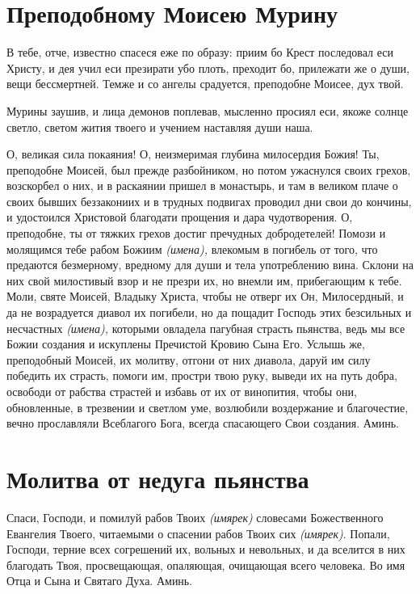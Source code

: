 \section{Преподобному Моисею Мурину}\begin{mymulticols}


В тебе, отче, известно спасеся еже по образу: приим бо Крест последовал еси Христу, и дея учил еси презирати убо плоть, преходит бо, прилежати же о души, вещи бессмертней. Темже и со ангелы срадуется, преподобне Моисее, дух твой.


Мурины заушив, и лица демонов поплевав, мысленно просиял еси, якоже солнце светло, светом жития твоего и учением наставляя души наша.


О, великая сила покаяния! О, неизмеримая глубина милосердия Божия! Ты, преподобне Моисей, был прежде разбойником, но потом ужаснулся своих грехов, возскорбел о них, и в раскаянии пришел в монастырь, и там в великом плаче о своих бывших беззакониих и в трудных подвигах проводил дни свои до кончины, и удостоился Христовой благодати прощения и дара чудотворения. О, преподобне, ты от тяжких грехов достиг пречудных добродетелей! Помози и молящимся тебе рабом Божиим {\itshape (имена),} влекомым в погибель от того, что предаются безмерному, вредному для души и тела употреблению вина. Склони на них свой милостивый взор и не презри их, но внемли им, прибегающим к тебе. Моли, святе Моисей, Владыку Христа, чтобы не отверг их Он, Милосердный, и да не возрадуется диавол их погибели, но да пощадит Господь этих безсильных и несчастных {\itshape (имена),} которыми овладела пагубная страсть пьянства, ведь мы все Божии создания и искуплены Пречистой Кровию Сына Его. Услышь же, преподобный Моисей, их молитву, отгони от них диавола, даруй им силу победить их страсть, помоги им, простри твою руку, выведи их на путь добра, освободи от рабства страстей и избавь от их от винопития, чтобы они, обновленные, в трезвении и светлом уме, возлюбили  воздержание и благочестие, вечно прославляли Всеблагого Бога, всегда спасающего Свои создания. Аминь.

\end{mymulticols}

\section{Молитва от недуга пьянства}\begin{mymulticols}

Спаси, Господи, и помилуй рабов Твоих {\itshape(имярек)} словесами Божественного Евангелия Твоего, читаемыми о спасении рабов Твоих сих {\itshape(имярек)}. Попали, Господи, терние всех согрешений их, вольных и невольных, и да вселится в них благодать Твоя, просвещающая, опаляющая, очищающая всего человека. Во имя Отца и Сына и Святаго Духа. Аминь.

\end{mymulticols}

